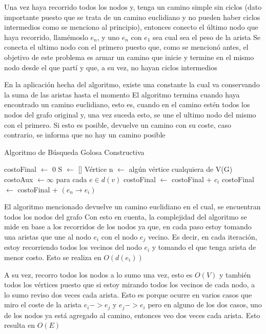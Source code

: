 \documentclass[10pt,a4paper]{article}
\begin{document}
Una vez haya recorrido todos los nodos y, tenga un camino simple sin ciclos (dato importante puesto que se trata de un camino euclidiano y no pueden haber ciclos intermedios como se menciono al principio), entonces conecto el último nodo que haya recorrido, llamémoslo $e_n$, y uno $e_n$ con $e_1$ sea cual sea el peso de la arista
Se conecta el ultimo nodo con el primero puesto que, como se mencionó antes, el objetivo de este problema es armar un camino que inicie y termine en el mismo nodo desde el que partí y que, a su vez, no hayan ciclos intermedios

En la aplicación hecha del algoritmo, existe una constante la cual va conservando la suma de las aristas hasta el momento
El algoritmo termina cuando haya encontrado un camino euclidiano, esto es, cuando en el camino estén todos los nodos del grafo original y, una vez suceda esto, se une el ultimo nodo del mismo con el primero. Si esto es posible, devuelve un camino con su coste, caso contrario, se informa que no hay un camino posible

\begin{algorithm}[H] 
\caption{Algoritmo de Búsqueda Golosa Constructiva}
\begin{algorithmic}[1]
\State costoFinal $\gets$ 0
    \State S $\gets$ []
    \State Vértice n $\gets$ algún vértice cualquiera de V(G)
    \State costoAux $\gets \infty$
    \State para cada $e \in d(v)$
        costoFinal $\gets$ costoFinal + $c_i$
    \EndIf
    costoFinal $\gets$ costoFinal + $(e_n \rightarrow e_i)$
\EndFunction
\end{algorithmic}
\label{alg:bg}
\end{algorithm}

El algoritmo mencionado devuelve un camino euclidiano en el cual, se encuentran todos los nodos del grafo
Con esto en cuenta, la complejidad del algoritmo se mide en base a los recorridos de los nodos ya que, en cada paso estoy tomando una aristas que une al nodo $e_i$ con el nodo $e_j$ vecino. Es decir, en cada iteración, estoy recorriendo todos los vecinos del nodo $e_i$ y tomando el que tenga arista de menor costo. Esto se realiza en $O(d(e_i))$

A su vez, recorro todos los nodos a lo sumo una vez, esto es $O(V)$ y también todos los vértices puesto que si estoy mirando todos los vecinos de cada nodo, a lo sumo reviso dos veces cada arista. Esto es porque ocurre en varios casos que miro el coste de la arista $e_i -> e_j$ y $e_j -> e_i$ pero en alguno de los dos casos, uno de los nodos ya está agregado al camino, entonces veo dos veces cada arista. Esto resulta en $O(E)$
\end{document}
